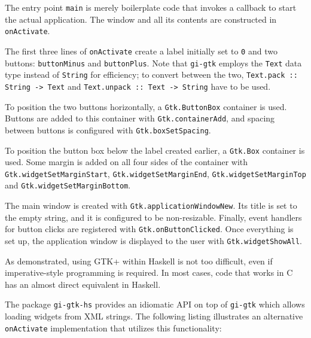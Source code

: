 \documentclass[UdineBachThesis,american,11pt]{PhdThesis}
\begin{document}
  \vspace{-2pt}

  The entry point \mbox{\texttt{main}} is merely boilerplate code that invokes a
  callback to start the actual application. The window and all its contents are
  constructed in \mbox{\texttt{onActivate}}.

  The first three lines of \mbox{\texttt{onActivate}} create a label initially
  set to \texttt{0} and two buttons: \mbox{\texttt{buttonMinus}} and
  \mbox{\texttt{buttonPlus}}. Note that \mbox{\texttt{gi-gtk}} employs the
  \mbox{\texttt{Text}} data type instead of \mbox{\texttt{String}} for
  efficiency; to convert between the two,
  \mbox{\texttt{Text.pack :: String -> Text}} and
  \mbox{\texttt{Text.unpack :: Text -> String}} have to be used.

  To position the two buttons horizontally, a \mbox{\texttt{Gtk.ButtonBox}}
  container is used. Buttons are added to this container with
  \mbox{\texttt{Gtk.containerAdd}}, and spacing between buttons is configured
  with \mbox{\texttt{Gtk.boxSetSpacing}}.

  To position the button box below the label created earlier, a
  \mbox{\texttt{Gtk.Box}} container is used. Some margin is added on all four
  sides of the container with \mbox{\texttt{Gtk.widgetSetMarginStart}},
  \mbox{\texttt{Gtk.widgetSetMarginEnd}}, \mbox{\texttt{Gtk.widgetSetMarginTop}}
  and \mbox{\texttt{Gtk.widgetSetMarginBottom}}.

  The main window is created with \mbox{\texttt{Gtk.applicationWindowNew}}. Its
  title is set to the empty string, and it is configured to be non-resizable.
  Finally, event handlers for button clicks are registered with
  \mbox{\texttt{Gtk.onButtonClicked}}. Once everything is set up, the
  application window is displayed to the user with
  \mbox{\texttt{Gtk.widgetShowAll}}.

  As demonstrated, using GTK+ within Haskell is not too difficult, even if
  imperative-style programming is required. In most cases, code that works in C
  has an almost direct equivalent in Haskell.

  The package \mbox{\texttt{gi-gtk-hs}} provides an idiomatic API on top of
  \mbox{\texttt{gi-gtk}} which allows loading widgets from XML strings. The
  following listing illustrates an alternative \mbox{\texttt{onActivate}}
  implementation that utilizes this functionality:
\end{document}
